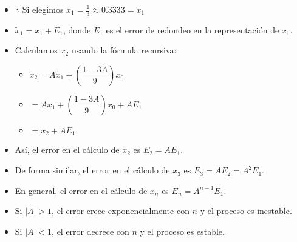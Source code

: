 \documentclass[
]{article}
\providecommand{\tightlist}{%
  \setlength{\itemsep}{0pt}\setlength{\parskip}{0pt}}
\begin{document}
\begin{itemize}
\tightlist
\item
  \(\therefore\) Si elegimos
  \(x_1=\frac{1}{3}\approx 0.3333=\tilde{x}_1\)
\item
  \(\tilde{x}_1=x_1+E_1\), donde \(E_1\) es el error de redondeo en la
  representación de \(x_1\).
\item
  Calculamos \(x_2\) usando la fórmula recursiva:

  \begin{itemize}
  \tightlist
  \item
    \(\tilde{x}_2 = A\tilde{x}_1 + \left(\dfrac{1-3A}{9}\right)x_0\)
  \item
    \(= Ax_1 + \left(\dfrac{1-3A}{9}\right)x_0 + AE_1\)
  \item
    \(= x_2 + AE_1\)
  \end{itemize}
\item
  Así, el error en el cálculo de \(x_2\) es \(E_2 = AE_1\).
\item
  De forma similar, el error en el cálculo de \(x_3\) es
  \(E_3 = AE_2 = A^2E_1\).
\item
  En general, el error en el cálculo de \(x_n\) es \(E_n = A^{n-1}E_1\).
\item
  Si \(|A| > 1\), el error crece exponencialmente con \(n\) y el proceso
  es inestable.
\item
  Si \(|A| < 1\), el error decrece con \(n\) y el proceso es estable.
\end{itemize}
\end{document}
